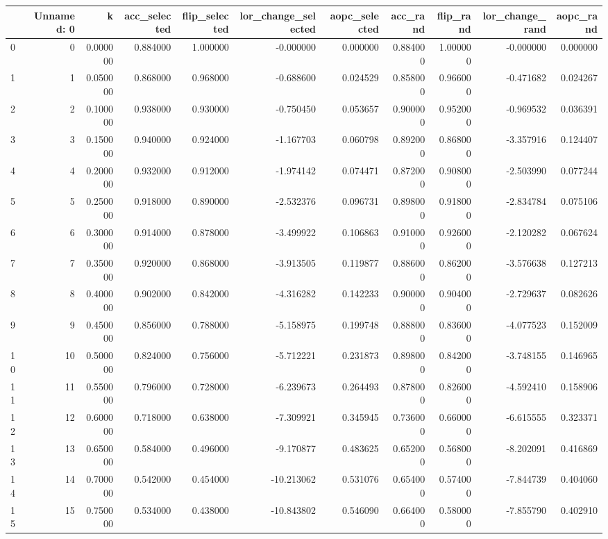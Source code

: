 \begin{tabular}{lrrrrrrrrrr}
\toprule
 & Unnamed: 0 & k & acc_selected & flip_selected & lor_change_selected & aopc_selected & acc_rand & flip_rand & lor_change_rand & aopc_rand \\
\midrule
0 & 0 & 0.000000 & 0.884000 & 1.000000 & -0.000000 & 0.000000 & 0.884000 & 1.000000 & -0.000000 & 0.000000 \\
1 & 1 & 0.050000 & 0.868000 & 0.968000 & -0.688600 & 0.024529 & 0.858000 & 0.966000 & -0.471682 & 0.024267 \\
2 & 2 & 0.100000 & 0.938000 & 0.930000 & -0.750450 & 0.053657 & 0.900000 & 0.952000 & -0.969532 & 0.036391 \\
3 & 3 & 0.150000 & 0.940000 & 0.924000 & -1.167703 & 0.060798 & 0.892000 & 0.868000 & -3.357916 & 0.124407 \\
4 & 4 & 0.200000 & 0.932000 & 0.912000 & -1.974142 & 0.074471 & 0.872000 & 0.908000 & -2.503990 & 0.077244 \\
5 & 5 & 0.250000 & 0.918000 & 0.890000 & -2.532376 & 0.096731 & 0.898000 & 0.918000 & -2.834784 & 0.075106 \\
6 & 6 & 0.300000 & 0.914000 & 0.878000 & -3.499922 & 0.106863 & 0.910000 & 0.926000 & -2.120282 & 0.067624 \\
7 & 7 & 0.350000 & 0.920000 & 0.868000 & -3.913505 & 0.119877 & 0.886000 & 0.862000 & -3.576638 & 0.127213 \\
8 & 8 & 0.400000 & 0.902000 & 0.842000 & -4.316282 & 0.142233 & 0.900000 & 0.904000 & -2.729637 & 0.082626 \\
9 & 9 & 0.450000 & 0.856000 & 0.788000 & -5.158975 & 0.199748 & 0.888000 & 0.836000 & -4.077523 & 0.152009 \\
10 & 10 & 0.500000 & 0.824000 & 0.756000 & -5.712221 & 0.231873 & 0.898000 & 0.842000 & -3.748155 & 0.146965 \\
11 & 11 & 0.550000 & 0.796000 & 0.728000 & -6.239673 & 0.264493 & 0.878000 & 0.826000 & -4.592410 & 0.158906 \\
12 & 12 & 0.600000 & 0.718000 & 0.638000 & -7.309921 & 0.345945 & 0.736000 & 0.660000 & -6.615555 & 0.323371 \\
13 & 13 & 0.650000 & 0.584000 & 0.496000 & -9.170877 & 0.483625 & 0.652000 & 0.568000 & -8.202091 & 0.416869 \\
14 & 14 & 0.700000 & 0.542000 & 0.454000 & -10.213062 & 0.531076 & 0.654000 & 0.574000 & -7.844739 & 0.404060 \\
15 & 15 & 0.750000 & 0.534000 & 0.438000 & -10.843802 & 0.546090 & 0.664000 & 0.580000 & -7.855790 & 0.402910 \\

\end{tabular}
